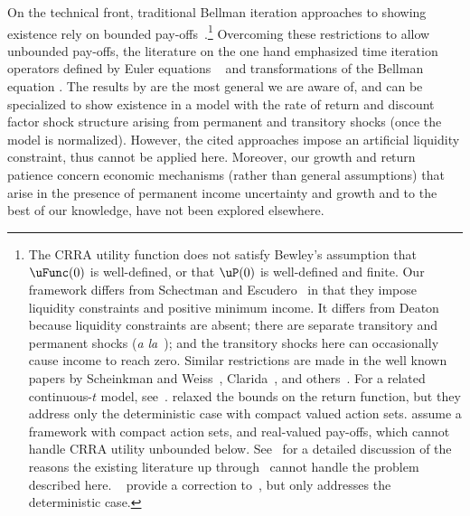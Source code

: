 \documentclass[BufferStockTheory]{subfiles}
\begin{document}
On the technical front, traditional Bellman iteration approaches to showing existence rely on bounded pay-offs~\citep{slpMethods}.\footnote{The CRRA utility function does not satisfy Bewley's assumption that $\uFunc(0)$ is well-defined, or that $\uP(0)$ is well-defined and finite.  Our framework differs from Schectman and Escudero~\citeyearpar{seIncFluct} in that they impose liquidity constraints and positive minimum income. It differs from Deaton~\citeyearpar{deatonLiqConstr} because liquidity constraints are absent; there are separate transitory and permanent shocks (\textit{a la}~\cite{muthOptimal}); and the transitory shocks here can occasionally cause income to reach zero. Similar restrictions are made in the well known papers by Scheinkman and Weiss~\citeyearpar{scheinkman&weiss:borrowing}, Clarida~\citep{claridaErgodic}, and others~\cite{cwcUnderUncert}. For a related continuous-$t$ model, see~\cite{tocheUrisk}. \cite{asHomogeneous} relaxed the bounds on the return function, but they address only the deterministic case with compact valued action sets. \cite{mnUnique} assume a framework with compact action sets, and real-valued pay-offs, which cannot handle CRRA utility unbounded below. See~\cite{yaoNote} for a detailed discussion of the reasons the existing literature up through~\cite{mnUnique} cannot handle the problem described here. \@~\cite{mvExistence} provide a correction to~\cite{rrExistence}, but only addresses the deterministic case.} Overcoming these restrictions to allow unbounded pay-offs, the literature on the one hand emphasized time iteration operators defined by Euler equations ~\citep{deatonLiqConstr, lsIncFluct, mstIncFluct} and transformations of the Bellman equation  \citep{maUnboundedDP}. The results by \cite{mstIncFluct,maUnboundedDP} are the most general we are aware of, and can be specialized to show existence in a model with the rate of return and discount factor shock structure arising from permanent and transitory shocks (once the model is normalized). However, the cited approaches impose an artificial liquidity constraint, thus cannot be applied here. Moreover, our  growth and return patience concern economic mechanisms (rather than general assumptions) that arise in the presence of permanent income uncertainty and growth and to the best of our knowledge, have not been explored elsewhere. 

% 
\end{document}
